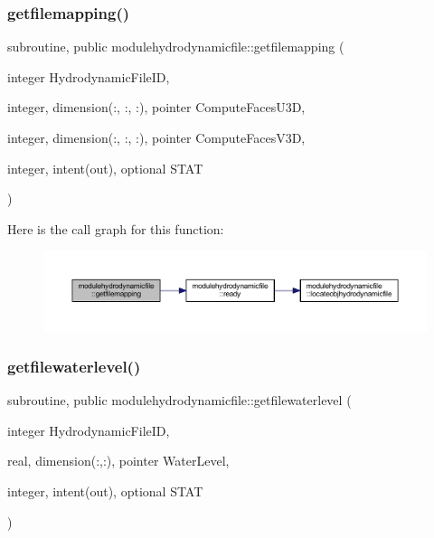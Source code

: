 \subsubsection{\texorpdfstring{getfilemapping()}{getfilemapping()}}
{\footnotesize\ttfamily subroutine, public modulehydrodynamicfile\+::getfilemapping (\begin{DoxyParamCaption}\item[{integer}]{Hydrodynamic\+File\+ID,  }\item[{integer, dimension(\+:, \+:, \+:), pointer}]{Compute\+Faces\+U3D,  }\item[{integer, dimension(\+:, \+:, \+:), pointer}]{Compute\+Faces\+V3D,  }\item[{integer, intent(out), optional}]{S\+T\+AT }\end{DoxyParamCaption})}

Here is the call graph for this function\+:\nopagebreak
\begin{figure}[H]
\begin{center}
\leavevmode
\includegraphics[width=350pt]{namespacemodulehydrodynamicfile_a9b237b5496d01afbf9b2c35f1ed0745c_cgraph}
\end{center}
\end{figure}
\mbox{\label{namespacemodulehydrodynamicfile_af996537253af14e50e63530e5814f6bb}} 
\subsubsection{\texorpdfstring{getfilewaterlevel()}{getfilewaterlevel()}}
{\footnotesize\ttfamily subroutine, public modulehydrodynamicfile\+::getfilewaterlevel (\begin{DoxyParamCaption}\item[{integer}]{Hydrodynamic\+File\+ID,  }\item[{real, dimension(\+:,\+:), pointer}]{Water\+Level,  }\item[{integer, intent(out), optional}]{S\+T\+AT }\end{DoxyParamCaption})}

